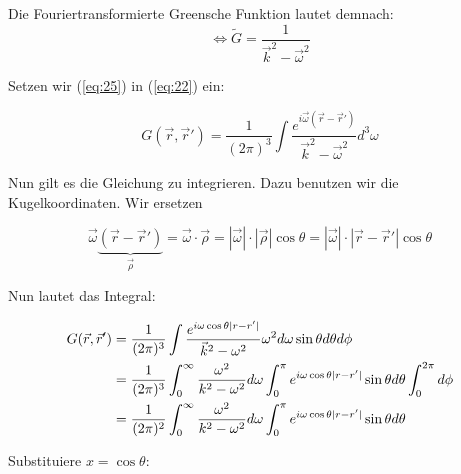 Die Fouriertransformierte Greensche Funktion lautet demnach:
\begin{equation}
  \label{eq:25}
  \Leftrightarrow \tilde G = \frac{1}{\vec k^2 -\vec \omega^2 }
\end{equation}

Setzen wir (\ref{eq:25}) in (\ref{eq:22}) ein:

\begin{equation}
  \label{eq:26}
  G(\vec r ,\vec r') = \frac{1}{(2\pi)^3}\int  \frac{ e^{i\vec \omega (\vec r -\vec r') }}{\vec k^2 -\vec \omega^2 }  d^3 \omega
\end{equation}


Nun gilt es die Gleichung zu integrieren. Dazu benutzen wir die Kugelkoordinaten. 
Wir ersetzen 


\[\vec \omega \underbrace{(\vec r-\vec r')}_{\vec \rho} = \vec\omega\cdot\vec\rho = |\vec \omega|\cdot|\vec \rho| \cos\theta = |\vec \omega|\cdot|\vec r-\vec r' | \cos\theta \]

Nun lautet das Integral:

\begin{align}
  \label{eq:27}
   G(\vec r ,\vec r') &= \frac{1}{(2\pi)^3} \int \frac{ e^{i\omega \cos\theta|r-r'| }}{\vec k^2 -\omega^2 }  \omega^2d\omega \sin\theta d\theta d\phi \notag\\
&= \frac{1}{(2\pi)^3} \int_0^{\infty} \frac{\omega^2}{k^2 -\omega^2 }  d\omega  \int_0^\pi e^{i\omega \cos\theta|r-r'| }  \sin\theta d\theta \int_0^{2\pi}d\phi\notag \\
&= \frac{1}{(2\pi)^2} \int_0^{\infty} \frac{\omega^2}{k^2 - \omega^2 }  d\omega  \int_0^\pi e^{i\omega \cos\theta|r-r'| }  \sin\theta d\theta 
\end{align}


Substituiere \(x=\cos\theta\):

